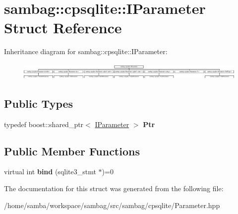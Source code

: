 \hypertarget{structsambag_1_1cpsqlite_1_1_i_parameter}{
\section{sambag::cpsqlite::IParameter Struct Reference}
\label{structsambag_1_1cpsqlite_1_1_i_parameter}
}
Inheritance diagram for sambag::cpsqlite::IParameter:\begin{figure}[H]
\begin{center}
\leavevmode
\includegraphics[height=0.845070cm]{structsambag_1_1cpsqlite_1_1_i_parameter}
\end{center}
\end{figure}
\subsection*{Public Types}
\begin{DoxyCompactItemize}
\item 
\hypertarget{structsambag_1_1cpsqlite_1_1_i_parameter_a7963bf41b6c1cfae43004cd5dfc17f08}{
typedef boost::shared\_\-ptr$<$ \hyperlink{structsambag_1_1cpsqlite_1_1_i_parameter}{IParameter} $>$ {\bfseries Ptr}}
\label{structsambag_1_1cpsqlite_1_1_i_parameter_a7963bf41b6c1cfae43004cd5dfc17f08}

\end{DoxyCompactItemize}
\subsection*{Public Member Functions}
\begin{DoxyCompactItemize}
\item 
\hypertarget{structsambag_1_1cpsqlite_1_1_i_parameter_abf833ee2693417d9837cd1d64bc6e459}{
virtual int {\bfseries bind} (sqlite3\_\-stmt $\ast$)=0}
\label{structsambag_1_1cpsqlite_1_1_i_parameter_abf833ee2693417d9837cd1d64bc6e459}

\end{DoxyCompactItemize}


The documentation for this struct was generated from the following file:\begin{DoxyCompactItemize}
\item 
/home/samba/workspace/sambag/src/sambag/cpsqlite/Parameter.hpp\end{DoxyCompactItemize}
